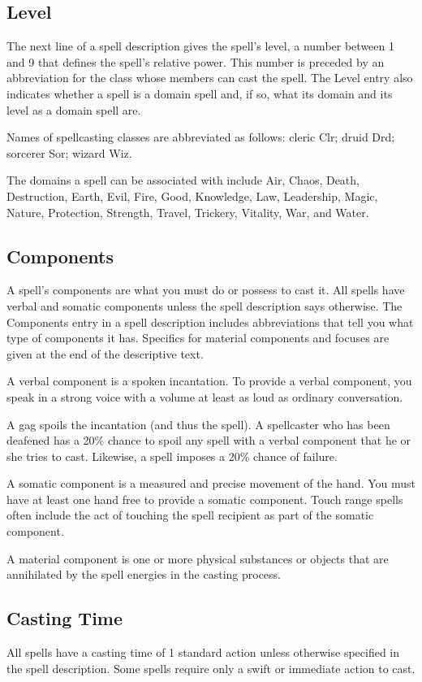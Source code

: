 \subsection{Level}
The next line of a spell description gives the spell's level, a number between 1 and 9 that defines the spell's relative power. This number is preceded by an abbreviation for the class whose members can cast the spell. The Level entry also indicates whether a spell is a domain spell and, if so, what its domain and its level as a domain spell are.

Names of spellcasting classes are abbreviated as follows: cleric Clr; druid Drd; sorcerer Sor; wizard Wiz.

The domains a spell can be associated with include Air, Chaos, Death, Destruction, Earth, Evil, Fire, Good, Knowledge, Law, Leadership, Magic, Nature, Protection, Strength, Travel, Trickery, Vitality, War, and Water.

\subsection{Components}
A spell's components are what you must do or possess to cast it. All spells have verbal and somatic components unless the spell description says otherwise. The Components entry in a spell description includes abbreviations that tell you what type of components it has. Specifics for material components and focuses are given at the end of the descriptive text.

 A verbal component is a spoken incantation. To provide a verbal component, you speak in a strong voice with a volume at least as loud as ordinary conversation.

A gag spoils the incantation (and thus the spell). A spellcaster who has been deafened has a 20\% chance to spoil any spell with a verbal component that he or she tries to cast. Likewise, a  spell imposes a 20\% chance of failure.

 A somatic component is a measured and precise movement of the hand. You must have at least one hand free to provide a somatic component. Touch range spells often include the act of touching the spell recipient as part of the somatic component.

 A material component is one or more physical substances or objects that are annihilated by the spell energies in the casting process.

\subsection{Casting Time}
All spells have a casting time of 1 standard action unless otherwise specified in the spell description. Some spells require only a swift or immediate action to cast.


